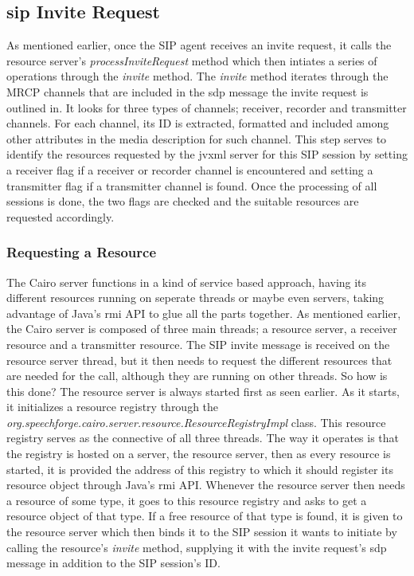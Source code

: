 \subsection{\ac{sip} Invite Request}
As mentioned earlier, once the SIP agent receives an invite request, it calls the resource server's \textit{processInviteRequest} method which then intiates a series of operations through the \textit{invite} method.
The \textit{invite} method iterates through the MRCP channels that are included in the \ac{sdp} message the invite request is outlined in.
It looks for three types of channels; receiver, recorder and transmitter channels.
For each channel, its ID is extracted, formatted and included among other attributes in the media description for such channel.
This step serves to identify the resources requested by the \ac{jvxml} server for this SIP session by setting a receiver flag if a receiver or recorder channel is encountered and setting a transmitter flag if a transmitter channel is found.
Once the processing of all sessions is done, the two flags are checked and the suitable resources are requested accordingly.

\subsubsection{Requesting a Resource}
The Cairo server functions in a kind of service based approach, having its different resources running on seperate threads or maybe even servers, taking advantage of Java's \ac{rmi} API to glue all the parts together.
As mentioned earlier, the Cairo server is composed of three main threads; a resource server, a receiver resource and a transmitter resource.
The SIP invite message is received on the resource server thread, but it then needs to request the different resources that are needed for the call, although they are running on other threads.
So how is this done?
The resource server is always started first as seen earlier.
As it starts, it initializes a resource registry through the \textit{org.speechforge.cairo.server.resource.ResourceRegistryImpl} class.
This resource registry serves as the connective of all three threads.
The way it operates is that the registry is hosted on a server, the resource server, then as every resource is started, it is provided the address of this registry to which it should register its resource object through Java's \ac{rmi} API.
Whenever the resource server then needs a resource of some type, it goes to this resource registry and asks to get a resource object of that type.
If a free resource of that type is found, it is given to the resource server which then binds it to the SIP session it wants to initiate by calling the resource's \textit{invite} method, supplying it with the invite request's \ac{sdp} message in addition to the SIP session's ID.

